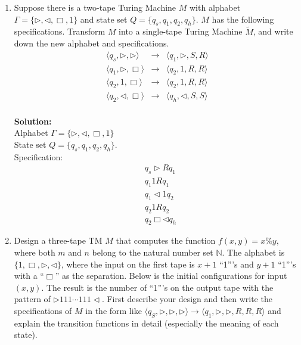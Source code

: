 \documentclass[12pt,a4paper]{article}
\theoremstyle{definition}
\numberwithin{equation}{section}
\numberwithin{figure}{section}
\begin{document}
\begin{enumerate}
\item Suppose there is a two-tape Turing Machine $M$ with alphabet $\Gamma = \{ \triangleright, \triangleleft, \Box, 1 \}$ and state set $Q = \{ q_s, q_1, q_2, q_h \}$. $M$ has the following specifications. Transform $M$ into a single-tape Turing Machine $\widetilde{M}$, and write down the new alphabet and specifications.
\begin{eqnarray*}
   \langle q_s,\triangleright,\triangleright  \rangle & \rightarrow & \langle q_1, \triangleright, S, R\rangle \\
   \langle q_1,\triangleright,\Box \rangle & \rightarrow & \langle q_2, 1, R, R\rangle \\
   \langle q_2, 1,\Box \rangle & \rightarrow & \langle q_2, 1, R, R\rangle \\
   \langle q_2, \triangleleft,\Box \rangle & \rightarrow & \langle q_h, \triangleleft, S, S\rangle
\end{eqnarray*}
\\
\textbf{Solution:}\\
Alphabet  $\Gamma = \{ \triangleright, \triangleleft, \Box, 1 \}$\\
State set $Q = \{ q_s, q_1, q_2, q_h \}$. \\
Specification:\\
\begin{eqnarray*}
	 & q_s \triangleright R q_1  \\
	 & q_1 1 R q_1 \\
	 & q_1 \triangleleft 1 q_2 \\
	 & q_2 1 R q_2\\
	 & q_2 \Box \triangleleft q_h
\end{eqnarray*}



\item Design a three-tape TM $M$ that computes the function $f(x,y) = x \% y$, where both $m$ and $n$ belong to the natural number set $\mathbb{N}$. The alphabet is $\{1, \Box, \triangleright, \triangleleft\}$, where the input on the first tape is $x+1$ ``1'''s and $y+1$ ``1'''s with a ``$\Box$'' as the separation. Below is the initial configurations for input $(x,y)$. The result is the number of ``1'''s on the output tape with the pattern of $\triangleright 111
\cdots 111\triangleleft$. First describe your design and then write the specifications of $M$ in the form like $\langle q_S, \triangleright, \triangleright, \triangleright \rangle \rightarrow \langle q_1, \triangleright, \triangleright, R, R, R\rangle$ and explain the transition functions in detail (especially the meaning of each state).


\end{enumerate}
\end{document}
